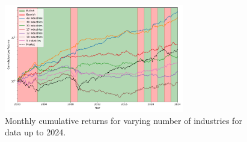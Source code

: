 \documentclass{article}
\begin{document}
\newpage

\begin{figure}[H]
    \centering
    \includegraphics[width=0.7\textwidth]{2024_plot3_num_industries_comparison.png}
    \caption{Monthly cumulative returns for varying number of industries for data up to 2024.}
    \label{fig:industry_comp}
\end{figure}
\end{document}
